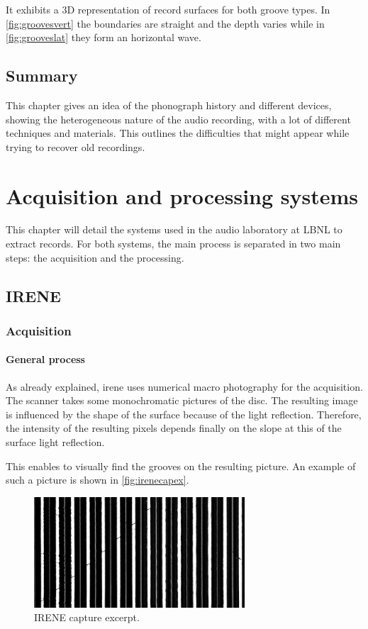 It exhibits a 3D representation of record surfaces for both groove types. In \autoref{fig:groovesvert} the boundaries are straight and the depth  varies while in \autoref{fig:grooveslat} they form an horizontal wave.

\section{Summary}

This chapter gives an idea of the phonograph history and different devices, showing the heterogeneous nature of the audio recording, with a lot of different techniques and materials. This outlines the difficulties that might appear while trying to recover old recordings.

\chapter{Acquisition and processing systems}

This chapter will detail the systems used in the audio laboratory at LBNL to extract records. For both systems, the main process is separated in two main steps: the acquisition and the processing.

\section{IRENE}

\subsection{Acquisition}

\subsubsection{General process}

As already explained, \gls{irene} uses numerical macro photography for the acquisition. The scanner takes some monochromatic pictures of the disc. The resulting image is influenced by the shape of the surface because of the light reflection. Therefore, the intensity of the resulting pixels depends finally on the slope at this of the surface light reflection.

This enables to visually find the grooves on the resulting picture. An example of such a picture is shown in \autoref{fig:irenecapex}.

\begin{figure}[!ht]
\centering
\includegraphics[width=0.7\textwidth]{images/irene-capture-ex}
\caption{IRENE capture excerpt.}
\label{fig:irenecapex}
\end{figure}

